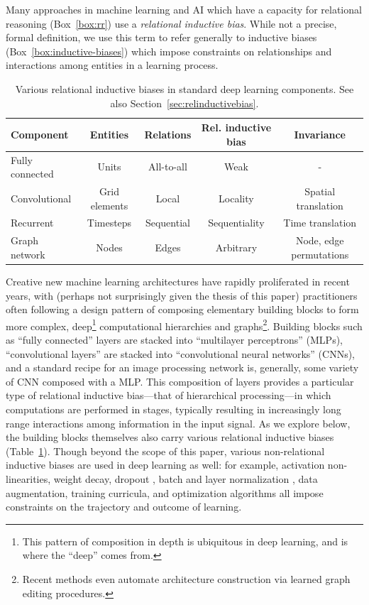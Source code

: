 Many approaches in machine learning and AI which have a capacity for relational reasoning (Box~\ref{box:rr}) use a \emph{relational inductive bias}.
While not a precise, formal definition, we use this term to refer generally to inductive biases (Box~\ref{box:inductive-biases}) which impose constraints on relationships and interactions among entities in a learning process. 

\begin{table}[t]
\centering
\begin{tabular}{lcccc}  
\toprule
\textbf{Component}   & \textbf{Entities} & \textbf{Relations} & \textbf{Rel. inductive bias} & \textbf{Invariance}\\
\midrule
Fully connected & Units & All-to-all & Weak & - \\
Convolutional & Grid elements & Local & Locality & Spatial translation\\
Recurrent & Timesteps & Sequential & Sequentiality & Time translation\\
Graph network & Nodes & Edges & Arbitrary & Node, edge permutations \\
\bottomrule
\end{tabular}
\caption{Various relational inductive biases in standard deep learning components. See also Section~\ref{sec:relinductivebias}.
}
\label{tbl:inductive-bias}
\end{table}

Creative new machine learning architectures have rapidly proliferated in recent years, with (perhaps not surprisingly given the thesis of this paper) practitioners often following a design pattern of composing elementary building blocks to form more complex, deep\footnote{This pattern of composition in depth is ubiquitous in deep learning, and is where the ``deep'' comes from.} computational hierarchies and graphs\footnote{Recent methods \citep{liu2017hierarchical} even automate architecture construction via learned graph editing procedures.}.
Building blocks such as ``fully connected'' layers are stacked into ``multilayer perceptrons'' (MLPs), ``convolutional layers'' are stacked into ``convolutional neural networks'' (CNNs), and a standard recipe for an image processing network is, generally, some variety of CNN composed with a MLP.
This composition of layers provides a particular type of relational inductive bias---that of hierarchical processing---in which computations are performed in stages, typically resulting in increasingly long range interactions among information in the input signal.
As we explore below, the building blocks themselves also carry various relational inductive biases (Table~\ref{tbl:inductive-bias}).
Though beyond the scope of this paper, various non-relational inductive biases are used in deep learning as well: for example, activation non-linearities, weight decay, dropout \citep{srivastava2014dropout}, batch and layer normalization \citep{ioffe2015batch,ba2016layer}, data augmentation, training curricula, and optimization algorithms all impose constraints on the trajectory and outcome of learning.

